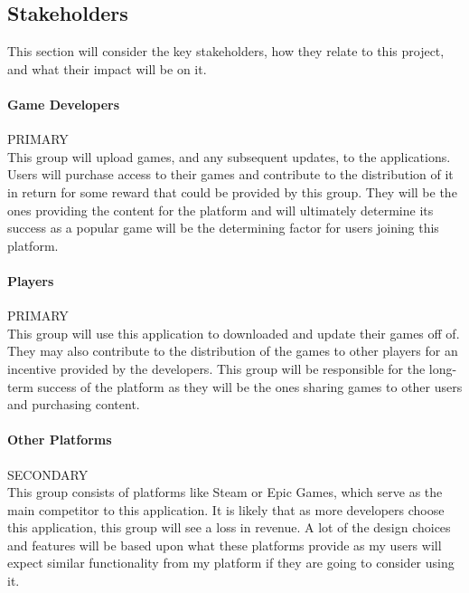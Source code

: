 
\subsection{Stakeholders}

This section will consider the key stakeholders, how they relate to this project, and what their impact will be on it.

\newcommand{\primary}{\hspace*{\fill}PRIMARY\\}
\newcommand{\secondary}{\hspace*{\fill}SECONDARY\\}
\newcommand{\tertiary}{\hspace*{\fill}TERTIARY\\}

\paragraph{Game Developers}\primary
This group will upload games, and any subsequent updates, to the applications. Users will purchase access to their games and contribute to the distribution of it in return for some reward that could be provided by this group.
\x
They will be the ones providing the content for the platform and will ultimately determine its success as a popular game will be the determining factor for users joining this platform. 

\paragraph{Players}\primary
This group will use this application to downloaded and update their games off of. They may also contribute to the distribution of the games to other players for an incentive provided by the developers.
\x
This group will be responsible for the long-term success of the platform as they will be the ones sharing games to other users and purchasing content. 

\paragraph{Other Platforms}\secondary
This group consists of platforms like Steam or Epic Games, which serve as the main competitor to this application. It is likely that as more developers choose this application, this group will see a loss in revenue.
\x
A lot of the design choices and features will be based upon what these platforms provide as my users will expect similar functionality from my platform if they are going to consider using it. 
